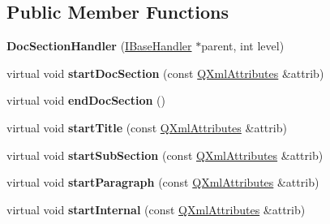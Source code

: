 \subsection*{Public Member Functions}
\begin{DoxyCompactItemize}
\item 
\mbox{\label{class_doc_section_handler_a7680a0a87a269ba03cf57d62dca55220}} 
{\bfseries Doc\+Section\+Handler} (\mbox{\hyperlink{class_i_base_handler}{I\+Base\+Handler}} $\ast$parent, int level)
\item 
\mbox{\label{class_doc_section_handler_a07a328d00eaeb72191e5938b81c29638}} 
virtual void {\bfseries start\+Doc\+Section} (const \mbox{\hyperlink{class_q_xml_attributes}{Q\+Xml\+Attributes}} \&attrib)
\item 
\mbox{\label{class_doc_section_handler_adbc298eb88b24c9f1cb5c2546f472ce7}} 
virtual void {\bfseries end\+Doc\+Section} ()
\item 
\mbox{\label{class_doc_section_handler_aa3df7cfd45a2201e2d1cf67744911b34}} 
virtual void {\bfseries start\+Title} (const \mbox{\hyperlink{class_q_xml_attributes}{Q\+Xml\+Attributes}} \&attrib)
\item 
\mbox{\label{class_doc_section_handler_ac865e9293bd9cd735baf4a98cf4c46df}} 
virtual void {\bfseries start\+Sub\+Section} (const \mbox{\hyperlink{class_q_xml_attributes}{Q\+Xml\+Attributes}} \&attrib)
\item 
\mbox{\label{class_doc_section_handler_a4ea3da121fa3112a0728d187e1f1c2f6}} 
virtual void {\bfseries start\+Paragraph} (const \mbox{\hyperlink{class_q_xml_attributes}{Q\+Xml\+Attributes}} \&attrib)
\item 
\mbox{\label{class_doc_section_handler_a0e82a6c353e8570170195e487c6f91bb}} 
virtual void {\bfseries start\+Internal} (const \mbox{\hyperlink{class_q_xml_attributes}{Q\+Xml\+Attributes}} \&attrib)
\item 
\mbox{\label{class_doc_section_handler_a124132d46ee237c4a820b065df44dfa0}} 

\end{DoxyCompactItemize}

